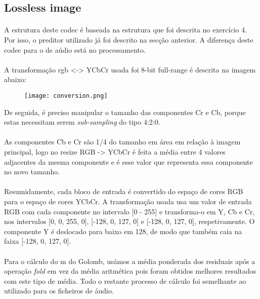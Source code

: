 \documentclass{report}
\begin{document}
\subsection*{Lossless image}
\paragraph{}

A estrutura deste codec é baseada na estrutura que foi descrita no exercício 4.
Por isso, o preditor utilizado já foi descrito na secção anterior. A diferença deste codec para o de aúdio está no processamento.
\paragraph{}
A transformação rgb <-> YCbCr usada foi 8-bit full-range é descrita na imagem abaixo:

\begin{center}
    \begin{figure} [h!]
    \centering
    \centering
    \texttt{[image: conversion.png]}
    \label{fig:conversão_RGB_YCbCr}
    \end{figure}
\end{center}

De seguida, é preciso manipular o tamanho das componentes Cr e Cb, porque estas necessitam serem \textit{sub-sampling} do tipo 4:2:0. \paragraph{}
As componentes Cb e Cr são 1/4 do tamanho em área em relação à imagem principal, logo no resize RGB -> YCbCr é feita a
média entre 4 valores adjacentes da mesma componente e é esse valor que representa essa componente no novo tamanho.
\paragraph{}
Resumidamente, cada bloco de entrada é convertido do espaço de cores RGB para o espaço de cores YCbCr. A transformação usada usa um valor de entrada RGB com cada componente no intervalo [0 - 255] e transforma-o em Y, Cb e Cr, nos intervalos [0, 0, 255, 0], [-128, 0, 127, 0] e [-128, 0, 127, 0], respetivamente. O componente Y é deslocado para baixo em 128, de modo que também caia na faixa [-128, 0, 127, 0]. 
\paragraph{}
Para o cálculo do m do Golomb, usámos a média ponderada dos residuais após a operação \textit{fold} em vez da média aritmética pois foram obtidos melhores resultados com este tipo de média. Todo o restante processo de cálculo foi semelhante ao utilizado para os ficheiros de áudio.
\end{document}
